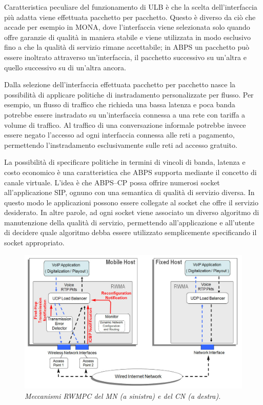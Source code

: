\documentclass[12pt,a4paper,openright,twoside]{book}
\begin{document}
Caratteristica peculiare del funzionamento di ULB è che la scelta
dell'interfaccia più adatta viene effettuata pacchetto per
pacchetto. Questo è diverso da ciò che accade per esempio in MONA,
dove l'interfaccia viene selezionata solo quando offre garanzie di
qualità in maniera stabile e viene utilizzata in modo esclusivo fino a
che la qualità di servizio rimane accettabile; in ABPS un pacchetto
può essere inoltrato attraverso un'interfaccia, il pacchetto
successivo su un'altra e quello successivo su di un'altra ancora.

Dalla selezione dell'interfaccia effettuata pacchetto per pacchetto
nasce la possibilità di applicare politiche di instradamento
personalizzate per flusso. Per esempio, un flusso di traffico che
richieda una bassa latenza e poca banda potrebbe essere instradato su
un'interfaccia connessa a una rete con tariffa a volume di
traffico. Al traffico di una conversazione informale potrebbe invece
essere negato l'accesso ad ogni interfaccia connessa alle reti a
pagamento, permettendo l'instradamento esclusivamente sulle reti ad
accesso gratuito.

La possibilità di specificare politiche in termini di vincoli di
banda, latenza e costo economico è una caratteristica che ABPS
supporta mediante il concetto di canale virtuale. L'idea è che
ABPS--CP possa offrire numerosi socket all'applicazione SIP, ognuno
con una semantica di qualità di servizio diversa. In questo modo le
applicazioni possono essere collegate al socket che offre il servizio
desiderato. In altre parole, ad ogni socket viene associato un diverso
algoritmo di manutenzione della qualità di servizio, permettendo
all'applicazione e all'utente di decidere quale algoritmo debba essere
utilizzato semplicemente specificando il socket appropriato.

\begin{figure}
  \centering
  \includegraphics[width=\textwidth]{img/rwma}
  \caption{\em Meccanismi RWMPC del MN (a sinistra) e del CN (a
    destra).}
  \label{fig:abps:rwmpc}
\end{figure}
\end{document}
